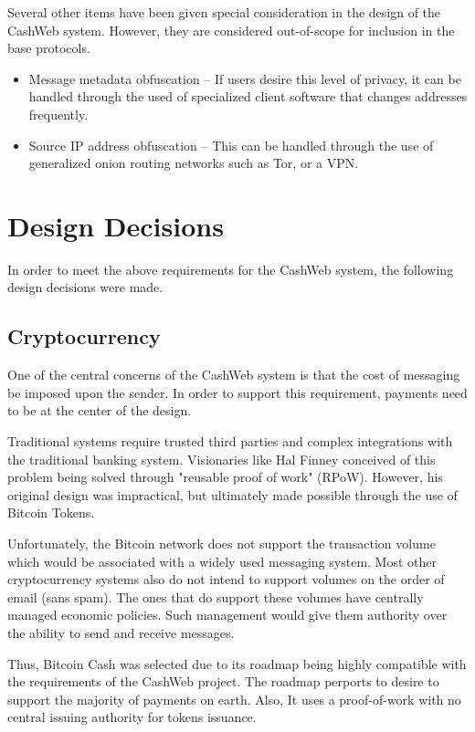\documentclass{article}
\theoremstyle{definition}
\begin{document}
Several other items have been given special consideration in the design of the CashWeb system. However, they are considered out-of-scope for inclusion in the base protocols.

\begin{itemize}
\item Message metadata obfuscation -- If users desire this level of privacy, it can be handled through the used of specialized client software that changes addresses frequently.
\item Source IP address obfuscation -- This can be handled through the use of generalized onion routing networks such as Tor, or a VPN.
\end{itemize}

\section{Design Decisions}
In order to meet the above requirements for the CashWeb system, the following design decisions were made.

\subsection{Cryptocurrency}
One of the central concerns of the CashWeb system is that the cost of messaging be imposed upon the sender. In order to support this requirement, payments need to be at the center of the design.

Traditional systems require trusted third parties and complex integrations with the traditional banking system. Visionaries like Hal Finney conceived of this problem being solved through "reusable proof of work" (RPoW). However, his original design was impractical, but ultimately made possible through the use of Bitcoin Tokens.

Unfortunately, the Bitcoin network does not support the transaction volume which would be associated with a widely used messaging system.  Most other cryptocurrency systems also do not intend to support volumes on the order of email (sans spam). The ones that do support these volumes have centrally managed economic policies. Such management would give them authority over the ability to send and receive messages.

Thus,  Bitcoin Cash was selected due to its roadmap being highly compatible with the requirements of the CashWeb project. The roadmap perports to desire to support the majority of payments on earth. Also, It uses a proof-of-work with no central issuing authority for tokens issuance.
\end{document}
